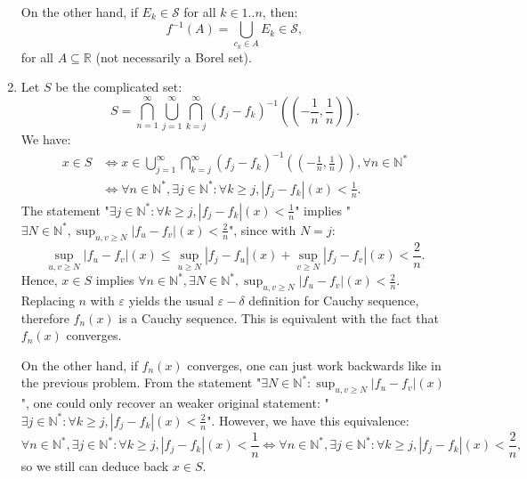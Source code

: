\begin{enumerate}[label=\textbf{2B.\arabic*}]
  On the other hand, if \( E_{k} \in \mathcal{S} \) for all \( k \in 1..n \),
  then:
  \[
    f^{-1}(A) = \bigcup_{c_{k} \in A} E_{k} \in \mathcal{S}
  ,\] for all \( A \subseteq \mathbb{R} \) (not necessarily a Borel set).
\item Let \( S \) be the complicated set:
  \[
    S = \bigcap_{n=1}^{\infty} \bigcup_{j=1}^{\infty} \bigcap_{k=j}^{\infty}
    (f_{j}-f_{k})^{-1}\left( \left( -\frac{1}{n}, \frac{1}{n} \right)  \right) 
  .\] 
  We have:
  \begin{align*}
    x \in S &\iff x \in \bigcup_{j=1}^{\infty} \bigcap_{k=j}^{\infty}
    (f_{j}-f_{k})^{-1}\left( \left( -\frac{1}{n}, \frac{1}{n} \right)  \right) ,
    \forall n \in \mathbb{N}^{*}\\
            &\iff \forall n \in \mathbb{N}^{*}, \exists j \in \mathbb{N}^{*}:
            \forall  k \ge j,
            |f_{j}-f_{k}|(x) <  \frac{1}{n}
  .\end{align*}
  The statement "\( \exists j \in \mathbb{N}^{*}: \forall k \ge j,
  |f_{j}-f_{k}|(x) < \frac{1}{n} \)" implies "\( \exists N \in \mathbb{N}^{*},
  \sup_{u, v \ge  N} |f_{u}-f_{v}|(x) < \frac{2}{n} \)", since with \( N = j \):
  \[
    \sup_{u, v \ge N} |f_{u}-f_{v}|(x) \le  \sup_{u\ge N}|f_{j}-f_{u}|(x) +
    \sup_{v\ge N}|f_{j}-f_{v}|(x) < \frac{2}{n}
  .\] 
  Hence, \( x \in S \) implies \( \forall n \in \mathbb{N}^{*}, \exists  N \in
  \mathbb{N}^{*}, \sup_{u, v \ge  N} |f_{u}-f_{v}|(x) < \frac{2}{n} \). Replacing
  \( n \) with \( \varepsilon \) yields the usual \( \varepsilon-\delta \)
  definition for Cauchy sequence, therefore \( f_{n}(x) \) is a Cauchy sequence.
  This is equivalent with the fact that \( f_{n}(x) \) converges.

  On the other hand, if \( f_{n}(x) \) converges, one can just work backwards
  like in the previous problem. From the statement "\( \exists N \in
  \mathbb{N}^{*}: \sup_{u,v \ge N} |f_{u}-f_{v}|(x) \)",
  one could only recover an weaker original statement: "\( \exists j \in
  \mathbb{N}^{*}: \forall k \ge j, |f_{j}-f_{k}|(x) < \frac{2}{n} \)". However,
  we have this equivalence:
  \[
            \forall n \in \mathbb{N}^{*}, \exists j \in \mathbb{N}^{*}:
            \forall  k \ge j,
            |f_{j}-f_{k}|(x) <  \frac{1}{n}
            \iff
            \forall n \in \mathbb{N}^{*}, \exists j \in \mathbb{N}^{*}:
            \forall  k \ge j,
            |f_{j}-f_{k}|(x) <  \frac{2}{n}
  ,\] so we still can deduce back \( x \in S \).


\end{enumerate}
